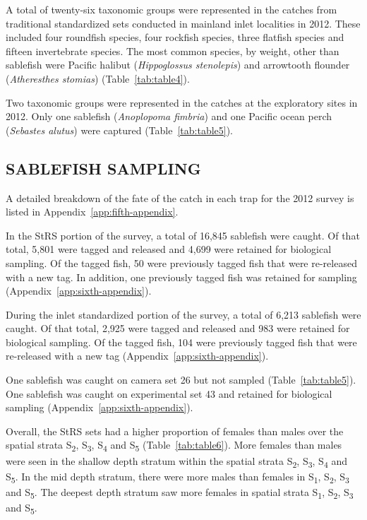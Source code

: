 \documentclass[12pt]{article}\usepackage[]{graphicx}\usepackage[]{color}
\begin{document}
A total of twenty-six taxonomic groups were represented in the catches from traditional standardized sets conducted in mainland inlet localities in 2012. These included four roundfish species, four rockfish species, three flatfish species and fifteen invertebrate species. The most common species, by weight, other than sablefish were Pacific halibut (\emph{Hippoglossus stenolepis}) and arrowtooth flounder (\emph{Atheresthes stomias}) (Table~\ref{tab:table4}).

Two taxonomic groups were represented in the catches at the exploratory sites in 2012. Only one sablefish (\emph{Anoplopoma fimbria}) and one Pacific ocean perch (\emph{Sebastes alutus}) were captured (Table~\ref{tab:table5}).

\hypertarget{sablefish-sampling}{%
\subsection{SABLEFISH SAMPLING}\label{sablefish-sampling}}

A detailed breakdown of the fate of the catch in each trap for the 2012 survey is listed in Appendix~\ref{app:fifth-appendix}.

In the StRS portion of the survey, a total of 16,845 sablefish were caught. Of that total, 5,801 were tagged and released and 4,699 were retained for biological sampling. Of the tagged fish, 50 were previously tagged fish that were re-released with a new tag. In addition, one previously tagged fish was retained for sampling (Appendix~\ref{app:sixth-appendix}).

During the inlet standardized portion of the survey, a total of 6,213 sablefish were caught. Of that total, 2,925 were tagged and released and 983 were retained for biological sampling. Of the tagged fish, 104 were previously tagged fish that were re-released with a new tag (Appendix~\ref{app:sixth-appendix}).

One sablefish was caught on camera set 26 but not sampled (Table~\ref{tab:table5}). One sablefish was caught on experimental set 43 and retained for biological sampling (Appendix~\ref{app:sixth-appendix}).

Overall, the StRS sets had a higher proportion of females than males over the spatial strata S\textsubscript{2}, S\textsubscript{3}, S\textsubscript{4} and S\textsubscript{5} (Table~\ref{tab:table6}). More females than males were seen in the shallow depth stratum within the spatial strata S\textsubscript{2}, S\textsubscript{3}, S\textsubscript{4} and S\textsubscript{5}. In the mid depth stratum, there were more males than females in S\textsubscript{1}, S\textsubscript{2}, S\textsubscript{3} and S\textsubscript{5}. The deepest depth stratum saw more females in spatial strata S\textsubscript{1}, S\textsubscript{2}, S\textsubscript{3} and S\textsubscript{5}.
\end{document}

